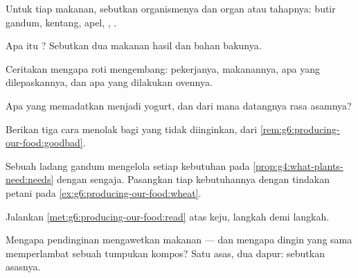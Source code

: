 \begin{exercise}[$\star$]\label{exo:g6:producing-our-food:2}
Untuk tiap makanan, sebutkan organismenya dan organ atau tahapnya:
butir gandum, kentang, apel, , .
\end{exercise}

\begin{exercise}[$\star$]\label{exo:g6:producing-our-food:3}
Apa itu ? Sebutkan dua makanan hasil  dan bahan
bakunya.
\end{exercise}

\begin{exercise}[$\star$]\label{exo:g6:producing-our-food:4}
Ceritakan mengapa roti mengembang: pekerjanya, makanannya, apa yang
dilepaskannya, dan apa yang dilakukan ovennya.
\end{exercise}

\begin{exercise}[$\star$]\label{exo:g6:producing-our-food:5}
Apa yang memadatkan  menjadi yogurt, dan dari mana datangnya rasa
asamnya?
\end{exercise}

\begin{exercise}[$\star$]\label{exo:g6:producing-our-food:6}
Berikan tiga cara menolak  bagi  yang tidak diinginkan,
dari \cref{rem:g6:producing-our-food:goodbad}.
\end{exercise}

\begin{exercise}[$\star\star$]\label{exo:g6:producing-our-food:7}
Sebuah ladang gandum mengelola setiap kebutuhan pada
\cref{prop:g4:what-plants-need:needs} dengan sengaja. Pasangkan tiap
kebutuhannya dengan tindakan petani pada
\cref{ex:g6:producing-our-food:wheat}.
\end{exercise}

\begin{exercise}[$\star\star$]\label{exo:g6:producing-our-food:8}
Jalankan \cref{met:g6:producing-our-food:read} atas keju, langkah demi
langkah.
\end{exercise}

\begin{exercise}[$\star\star$]\label{exo:g6:producing-our-food:9}
Mengapa pendinginan mengawetkan makanan --- dan mengapa dingin yang
sama memperlambat sebuah tumpukan kompos? Satu asas, dua dapur:
sebutkan asasnya.
\end{exercise}

